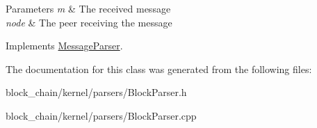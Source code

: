 \begin{DoxyParams}{Parameters}
{\em m} & The received message \\
\hline
{\em node} & The peer receiving the message \\
\hline
\end{DoxyParams}


Implements \mbox{\hyperlink{classMessageParser_a946f3b936dc01a75d6165329b159ecfe}{Message\+Parser}}.



The documentation for this class was generated from the following files\+:\begin{DoxyCompactItemize}
\item 
block\+\_\+chain/kernel/parsers/Block\+Parser.\+h\item 
block\+\_\+chain/kernel/parsers/Block\+Parser.\+cpp\end{DoxyCompactItemize}

